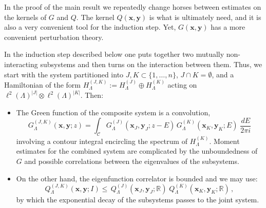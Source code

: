 \documentclass[reqno,keywordsasfootnote]{article}
\numberwithin{equation}{section}
\theoremstyle{definition}
\begin{document}
In the proof of the main result we repeatedly change horses between estimates on the kernels of $G$ and  $Q$.  The kernel $Q({\mathbf{x}},{\mathbf{y}}) $ is what is ultimately need, and  
it is also a very convenient tool for the induction step.  
Yet, $G({\mathbf{x}},{\mathbf{y}})$ has a more convenient perturbation theory. 

In the induction step described below one puts together two mutually non-interacting subsystems and then turns on the interaction between them.   Thus, we start with the system partitioned into 
$ J, K \subset \{ 1 , \dots , n \} $, $ J \cap K = \emptyset $, and   a  Hamiltonian of the form   
$ H^{(J,K)}_\Lambda := H^{(J)}_\Lambda \oplus H^{(K)}_\Lambda $ acting on  $ \ell^2(\Lambda)^{|J|} \otimes \ell^2(\Lambda)^{|K|} $.  Then: 

\begin{itemize}
\item The Green function of the composite system  is a 
 convolution, 
 \begin{equation}
 	 G^{(J,K)}_\Lambda({\mathbf{x}},{\mathbf{y}};z) = 
 \int_\mathcal{C} G^{(J)}_\Lambda({\mathbf{x}}_J,{\mathbf{y}}_J;z-E) \, G^{(K)}_\Lambda({\mathbf{x}}_K,{\mathbf{y}}_K;E) \; \frac{dE}{2\pi i }  
\end{equation}
involving a contour integral encircling the spectrum of $ H^{(K)}_\Lambda $.  Moment estimates for the combined system are  complicated by the unboundedness of $G$ and possible correlations between the  eigenvalues of the subsystems. 
\item On the other hand,  the eigenfunction correlator is bounded and  we may use:
\begin{equation}\label{eq:ecpartial}
	Q^{(J,K)}_\Lambda({\mathbf{x}},{\mathbf{y}};I) 
		\leq \,  Q^{(J)}_\Lambda({\mathbf{x}}_J,{\mathbf{y}}_J; \mathbb{R}) \; Q^{(K)}_\Lambda({\mathbf{x}}_K,{\mathbf{y}}_K; \mathbb{R}) \, ,  
\end{equation}
by which the exponential decay of the subsystems  passes to the joint system. 
\end{itemize}
\end{document}

